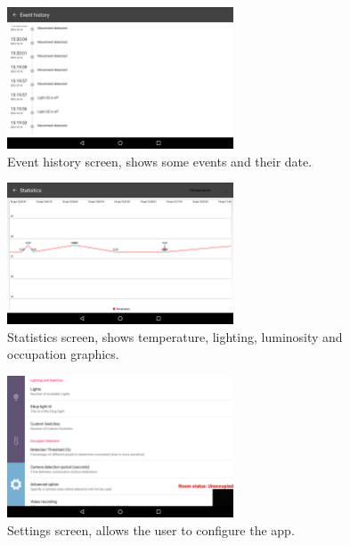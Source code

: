 \begin{figure}[H]
\centering
\includegraphics[width=0.6\textwidth]{Figures/hub_history}
\caption{Event history screen, shows some events and their date.}
\label{screen_hub_history}
\end{figure}

\begin{figure}[H]
\centering
\includegraphics[width=0.6\textwidth]{Figures/hub_stats}
\caption{Statistics screen, shows temperature, lighting, luminosity and occupation graphics.}
\label{screen_hub_stats}
\end{figure}

\begin{figure}[H]
\centering
\includegraphics[width=0.6\textwidth]{Figures/hub_settings}
\caption{Settings screen, allows the user to configure the app.}
\label{screen_hub_settings}
\end{figure}


